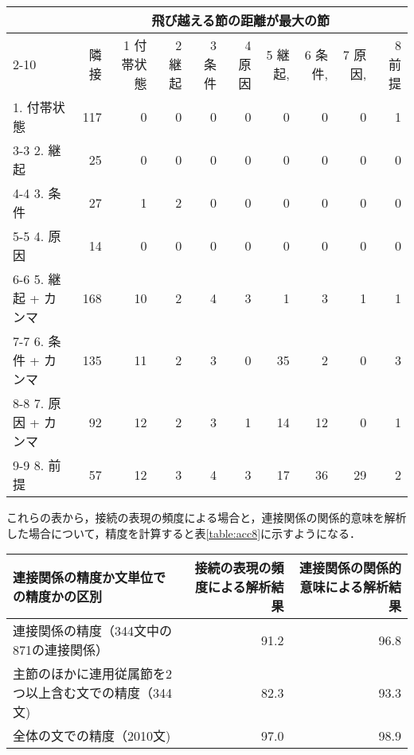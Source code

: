 \begin{table*}
\caption{用例における連接関係で係り側と飛び越える節の頻度（8分類で連接関係の関係的意味による）}
\label{table:freq8sj}
\begin{tabular}{|l|r|r|r|r|r|r|r|r|r|}
\hline
\multicolumn{1}{|p{10zw}|}{} & \multicolumn{9}{|c|}{飛び越える節の距離が最大の節}\\
\cline{2-10}
\multicolumn{1}{|c|}{係り側} & \multicolumn{1}{|p{2zw}|}{隣接} & \multicolumn{1}{|p{2zw}|}{1 付帯状態} & \multicolumn{1}{|p{2zw}|}{2 継起} & \multicolumn{1}{|p{2zw}|}{3 条件} & \multicolumn{1}{|p{2zw}|}{4 原因} & \multicolumn{1}{|p{2zw}|}{5 継起,} & \multicolumn{1}{|p{2zw}|}{6 条件,} & \multicolumn{1}{|p{2zw}|}{7 原因,} & \multicolumn{1}{|p{2zw}|}{8 前提}\\
\hline
1. 付帯状態 & 117 & 0 & 0 & 0 & 0 & 0 & 0 & 0 & 1 \\
\cline{3-3}
2. 継起 & 25 & 0 & 0 & 0 & 0 & 0 & 0 & 0 & 0 \\
\cline{4-4}
3. 条件 & 27 & 1 & 2 & 0 & 0 & 0 & 0 & 0 & 0 \\
\cline{5-5}
4. 原因 & 14 & 0 & 0 & 0 & 0 & 0 & 0 & 0 & 0 \\
\cline{6-6}
5. 継起 + カンマ & 168 & 10 & 2 & 4 & 3 & 1 & 3 & 1 & 1 \\
\cline{7-7}
6. 条件 + カンマ & 135 & 11 & 2 & 3 & 0 & 35 & 2 & 0 & 3 \\
\cline{8-8}
7. 原因 + カンマ & 92 & 12 & 2 & 3 & 1 & 14 & 12 & 0 & 1 \\
\cline{9-9}
8. 前提 & 57 & 12 & 3 & 4 & 3 & 17 & 36 & 29 & 2 \\
\hline
\end{tabular}
\end{table*}

これらの表から，接続の表現の頻度による場合と，連接関係の関係的意味を解析した場合について，精度を計算すると表\ref{table:acc8}に示すようになる．

\begin{table*}
\caption{8分類を用いた場合の連接構造の解析精度（単位：％） }
\label{table:acc8}
\begin{tabular}{|l|r|r|}
\hline
\multicolumn{1}{|p{20zw}|}{連接関係の精度か文単位での精度かの区別} & \multicolumn{1}{|p{5zw}|}{接続の表現の頻度による解析結果} & \multicolumn{1}{|p{5zw}|}{連接関係の関係的意味による解析結果}\\
\hline
連接関係の精度（344文中の871の連接関係）&  91.2 &  96.8 \\
主節のほかに連用従属節を2つ以上含む文での精度（344文) & 82.3 & 93.3 \\
全体の文での精度（2010文) & 97.0 & 98.9 \\
\hline
\end{tabular}
\end{table*}


